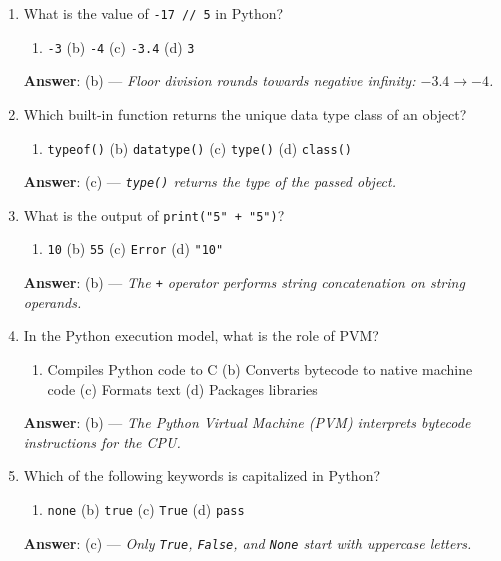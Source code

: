 \begin{enumerate}[leftmargin=1.5em]
    \item What is the value of \texttt{-17 // 5} in Python?
    \begin{enumerate}[label=(\alph*)]
        \item \texttt{-3} \quad (b) \texttt{-4} \quad (c) \texttt{-3.4} \quad (d) \texttt{3}
    \end{enumerate}
    \textbf{Answer}: (b) --- \textit{Floor division rounds towards negative infinity: $-3.4 \to -4$.}

    \item Which built-in function returns the unique data type class of an object?
    \begin{enumerate}[label=(\alph*)]
        \item \texttt{typeof()} \quad (b) \texttt{datatype()} \quad (c) \texttt{type()} \quad (d) \texttt{class()}
    \end{enumerate}
    \textbf{Answer}: (c) --- \textit{\texttt{type()} returns the type of the passed object.}

    \item What is the output of \texttt{print("5" + "5")}?
    \begin{enumerate}[label=(\alph*)]
        \item \texttt{10} \quad (b) \texttt{55} \quad (c) \texttt{Error} \quad (d) \texttt{"10"}
    \end{enumerate}
    \textbf{Answer}: (b) --- \textit{The \texttt{+} operator performs string concatenation on string operands.}

    \item In the Python execution model, what is the role of PVM?
    \begin{enumerate}[label=(\alph*)]
        \item Compiles Python code to C \quad (b) Converts bytecode to native machine code \quad (c) Formats text \quad (d) Packages libraries
    \end{enumerate}
    \textbf{Answer}: (b) --- \textit{The Python Virtual Machine (PVM) interprets bytecode instructions for the CPU.}

    \item Which of the following keywords is capitalized in Python?
    \begin{enumerate}[label=(\alph*)]
        \item \texttt{none} \quad (b) \texttt{true} \quad (c) \texttt{True} \quad (d) \texttt{pass}
    \end{enumerate}
    \textbf{Answer}: (c) --- \textit{Only \texttt{True}, \texttt{False}, and \texttt{None} start with uppercase letters.}
\end{enumerate}

